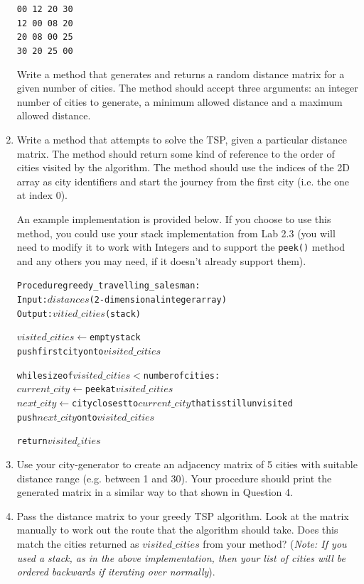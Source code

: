 \documentclass[11pt,a4paper]{report}
\begin{document}
\begin{enumerate}
    \begin{center}\texttt{00  12  20  30 \\
        12  00  08  20 \\
        20  08  00  25 \\
        30  20  25  00}
    \end{center}

    Write a method that generates and returns a random distance matrix for a given number of cities. The method should accept three arguments: an integer number of cities to generate, a minimum allowed distance and a maximum allowed distance.

\item Write a method that attempts to solve the TSP, given a particular distance matrix. The method should return some kind of reference to the order of cities visited by the algorithm. The method should use the indices of the 2D array as city identifiers and start the journey from the first city (i.e. the one at index 0).

    An example implementation is provided below. If you choose to use this method, you could use your stack implementation from Lab 2.3 (you will need to modify it to work with Integers and to support the \texttt{peek()} method and any others you may need, if it doesn't already support them).

\begin{alltt}
Procedure greedy\_travelling\_salesman:
    Input: \(distances\) (2-dimensional integer array)
    Output: \(vitied\_cities\) (stack)

    \(visited\_cities \gets \) empty stack
    push first city onto \(visited\_cities\)

    while size of \(visited\_cities < \) number of cities:
        \(current\_city \gets\) peek at \(visited\_cities\)
        \(next\_city \gets\) city closest to \(current\_city\) that is still unvisited
        push \(next\_city\) onto \(visited\_cities\)
    
    return \(visited_cities\)
\end{alltt}

\item Use your city-generator to create an adjacency matrix of 5 cities with suitable distance range (e.g. between 1 and 30). Your procedure should print the generated matrix in a similar way to that shown in Question 4.

\item Pass the distance matrix to your greedy TSP algorithm. Look at the matrix manually to work out the route that the algorithm should take. Does this match the cities returned as $visited\_cities$ from your method? (\textit{Note: If you used a stack, as in the above implementation, then your list of cities will be ordered backwards if iterating over normally}).
    

\end{enumerate}
\end{document}
